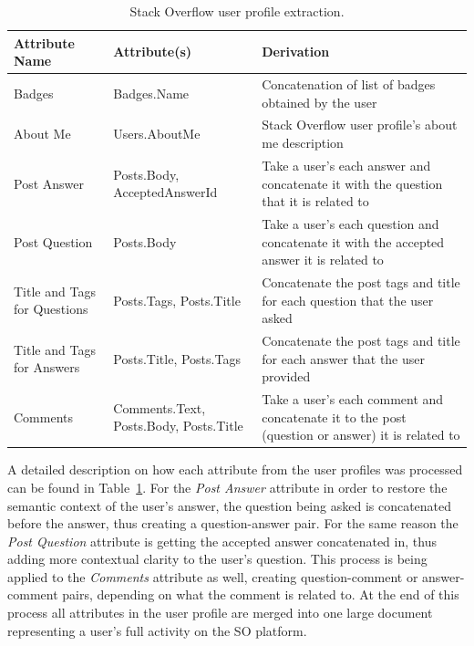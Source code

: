         \begin{table}[!htbp]
            \centering
            \label{tab:SO_userProfileExtraction}
            \caption{Stack Overflow user profile extraction.}
            \vspace{6pt} %
            \begin{tabular}{|p{3.3cm}|p{2.7cm}|p{8cm}|}
               \toprule
               \textbf{Attribute Name} & \textbf{Attribute(s)} & \textbf{Derivation} \\
               \toprule
                Badges & Badges.Name & Concatenation of list of badges obtained by the user \\
                About Me & Users.AboutMe & Stack Overflow user profile's about me description \\
                Post Answer & Posts.Body, AcceptedAnswerId & Take a user's each answer and concatenate it with the question that it is related to  \\
                Post Question & Posts.Body & Take a user's each question and concatenate it with the accepted answer it is related to  \\
                Title and Tags for Questions & Posts.Tags, Posts.Title & Concatenate the post tags and title for each question that the user asked \\
                Title and Tags for Answers & Posts.Title, Posts.Tags & Concatenate the post tags and title for each answer that the user provided \\
                Comments & Comments.Text, Posts.Body, Posts.Title & Take a user's each comment and concatenate it to the post (question or answer) it is related to \\
               \bottomrule
            \end{tabular}
        \end{table} 
        
        A detailed description on how each attribute from the user profiles was processed can be found in Table~\ref{tab:SO_userProfileExtraction}. For the \textit{Post Answer} attribute in order to restore the semantic context of the user's answer, the question being asked is concatenated before the answer, thus creating a question-answer pair. For the same reason the \textit{Post Question} attribute is getting the accepted answer concatenated in, thus adding more contextual clarity to the user's question. This process is being applied to the \textit{Comments} attribute as well, creating question-comment or answer-comment pairs, depending on what the comment is related to. At the end of this process all attributes in the user profile are merged into one large document representing a user's full activity on the SO platform. 
        
